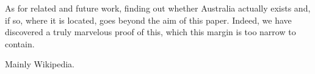 \documentclass{article}
\begin{document}
As for related and future work, finding out whether Australia actually exists and, if so, where it is located, goes beyond the aim of this paper. Indeed, we have discovered a truly marvelous proof of this, which this margin is too narrow to contain.

\begin{thebibliography}{1}

  Mainly Wikipedia.

\end{thebibliography}
\end{document}
